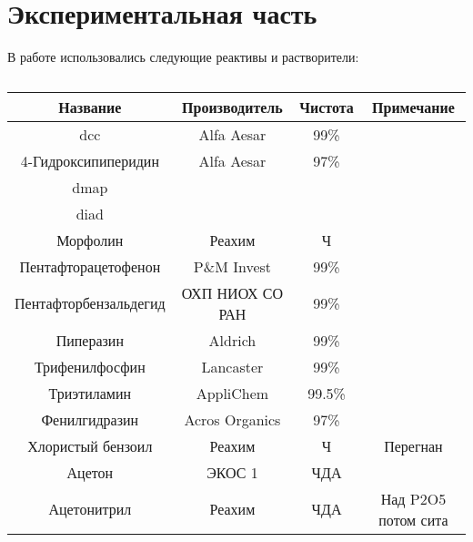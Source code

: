 \section{Экспериментальная часть}
В работе использовались следующие реактивы и растворители:
\begin{table}[]
    \centering
    \caption{}
    \begin{small}
        \begin{tabular}{cccc}
            \toprule
            \textbf{Название}     & \textbf{Производитель} & \textbf{Чистота} & \textbf{Примечание} \\
            \midrule
            dcc                   & Alfa Aesar             & 99\%             &                     \\
            4-Гидроксипиперидин   & Alfa Aesar             & 97\%             &                     \\
            dmap                  &                        &                  &                     \\
            diad                  &                        &                  &                     \\
            Морфолин              & Реахим                 & Ч                &                     \\
            Пентафторацетофенон   & P\&M Invest            & 99\%             &                     \\
            Пентафторбензальдегид & ОХП НИОХ СО РАН        & 99\%             &                     \\
            Пиперазин             & Aldrich                & 99\%             &                     \\
            Трифенилфосфин        & Lancaster              & 99\%             &                     \\
            Триэтиламин           & AppliChem              & 99.5\%           &                     \\
            Фенилгидразин         & Acros Organics         & 97\%             &                     \\
            Хлористый бензоил     & Реахим                 & Ч                & Перегнан            \\
            \midrule
            Ацетон                & ЭКОС 1                 & ЧДА              &                     \\
            Ацетонитрил           & Реахим                 & ЧДА              & Над P2O5 потом сита \\

\end{tabular}
\end{small}
\end{table}
